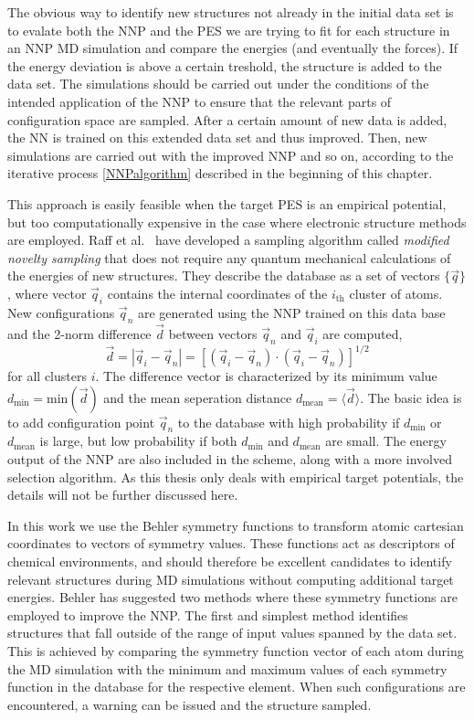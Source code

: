 \documentclass[twoside,english]{uiofysmaster}
\begin{document}
The obvious way to identify new structures not already in the initial data set is to evalate both the NNP and 
the PES we are trying to fit for each structure in an NNP MD simulation and compare the energies (and eventually 
the forces). If the energy deviation is above a certain treshold, the structure is added to the data set.
The simulations should be carried out under the conditions of the intended application of the NNP to ensure
that the relevant parts of configuration space are sampled.
After a certain amount of new data is added, 
the NN is trained on this extended data set and thus improved. Then, new simulations are carried out with the improved
NNP and so on, according to the iterative process \autoref{NNPalgorithm} described in the beginning of this chapter. 

This approach is easily feasible when the target PES is an empirical potential, but too computationally expensive 
in the case where electronic structure methods are employed. Raff et al.\ \cite{Raff05} have developed a sampling
algorithm called \textit{modified novelty sampling} that does not require any quantum mechanical calculations of
the energies of new structures. They describe the database as a set of vectors $\{\vec{q}\}$, where vector
$\vec{q}_i$ contains the internal coordinates of the $i_\textrm{th}$ cluster of atoms. New configurations
$\vec{q}_n$ are generated using the NNP trained on this data base and the 2-norm difference $\vec{d}$ between vectors
$\vec{q}_n$ and $\vec{q}_i$ are computed,
\begin{equation}
 \vec{d} = | \vec{q}_i - \vec{q}_n | = 
 \left[(\vec{q}_i - \vec{q}_n)\cdot(\vec{q}_i - \vec{q}_n)\right]^{1/2}
\end{equation}
for all clusters $i$. The difference vector is characterized by its minimum value $d_\textrm{min} = \textrm{min}(\vec{d})$ and 
the mean seperation distance $d_\textrm{mean} = \langle\vec{d}\rangle$. 
The basic idea is to add configuration point $\vec{q}_n$ to the database with high
probability if $d_\textrm{min}$ or $d_\textrm{mean}$ is large, but low probability if both 
$d_\textrm{min}$ and $d_\textrm{mean}$ are small. The energy output of the NNP are also included in the scheme, along with
a more involved selection algorithm. As this thesis only deals with empirical target potentials, the details will
not be further discussed here. 

In this work we use the Behler symmetry functions to transform atomic cartesian coordinates to vectors of symmetry values.
These functions act as descriptors of chemical environments, and should therefore be excellent candidates
to identify relevant structures during MD simulations without computing additional target energies. 
Behler has suggested two methods \cite{Behler11general} where these symmetry functions are employed to improve the NNP. 
The first and simplest method identifies structures that fall outside of the range of input values spanned by the data set. 
This is achieved by comparing the symmetry function vector of each atom during the MD simulation with 
the minimum and maximum values of each symmetry function in the database for the respective element. 
When such configurations are encountered, a warning can be issued and the structure sampled.  
\end{document}
